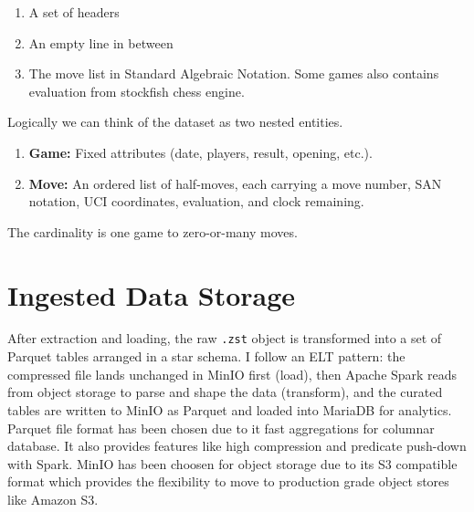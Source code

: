 \begin{enumerate}
    \item A set of headers
    \item An empty line in between
    \item The move list in Standard Algebraic Notation. Some games also contains evaluation from stockfish chess engine.
\end{enumerate}



Logically we can think of the dataset as two nested entities.
\begin{enumerate}
 \item \textbf{Game:} Fixed attributes (date, players, result, opening, etc.).
 \item \textbf{Move:} An ordered list of half-moves, each carrying a move number, SAN notation, UCI coordinates, evaluation, and clock remaining. 
\end{enumerate}

The cardinality is one game to zero-or-many moves.

\section{Ingested Data Storage}
\label{ingested_data_storage}
After extraction and loading, the raw \texttt{.zst} object is transformed into a set of Parquet tables arranged in a star schema. I follow an ELT pattern: the compressed file lands unchanged in MinIO first (load), then Apache Spark reads from object storage to parse and shape the data (transform), and the curated tables are written to MinIO as Parquet and loaded into MariaDB for analytics. Parquet file format has been chosen due to it fast aggregations for columnar database. It also provides features like high compression and predicate push-down with Spark. MinIO has been choosen for object storage due to its S3 compatible format which provides the flexibility to move to production grade object stores like Amazon S3. 


